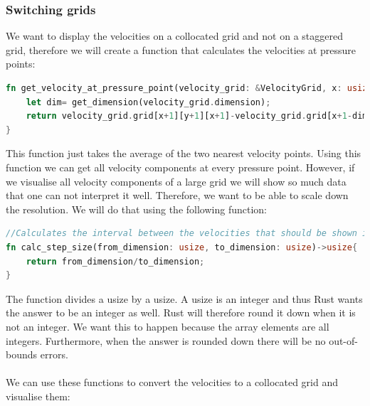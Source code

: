 \documentclass{article}
\begin{document}
\subsubsection{Switching grids}
We want to display the velocities on a collocated grid and not on a staggered grid, therefore we will create a function that calculates the velocities at pressure points:

\begin{lstlisting}[language=Rust, style=boxed, breaklines=true]
fn get_velocity_at_pressure_point(velocity_grid: &VelocityGrid, x: usize, y: usize, z: usize)->f32{
    let dim= get_dimension(velocity_grid.dimension);
    return velocity_grid.grid[x+1][y+1][x+1]-velocity_grid.grid[x+1-dim[0]][y+1-dim[1]][z+1-dim[2]];//Just take the average
}
\end{lstlisting}
This function just takes the average of the two nearest velocity points. Using this function we can get all velocity components at every pressure point. However, if we visualise all velocity components of a large grid we will show so much data that one can not interpret it well. Therefore, we want to be able to scale down the resolution. We will do that using the following function:
\begin{lstlisting}[language=Rust, style=boxed, breaklines=true]
//Calculates the interval between the velocities that should be shown in one dimension
fn calc_step_size(from_dimension: usize, to_dimension: usize)->usize{
    return from_dimension/to_dimension;
} 
\end{lstlisting}
The function divides a usize by a usize. A usize is an integer and thus Rust wants the answer to be an integer as well. Rust will therefore round it down when it is not an integer. We want this to happen because the array elements are all integers. Furthermore, when the answer is rounded down there will be no out-of-bounds errors. 
\\ \\
We can use these functions to convert the velocities to a collocated grid and visualise them:
\end{document}
